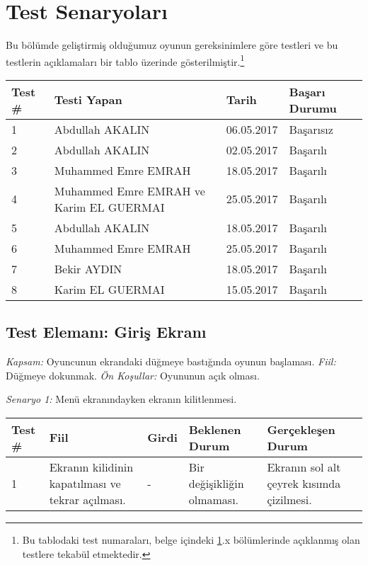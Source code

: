 \documentclass[12pt,a4paper]{article}
\begin{document}
   \section{Test Senaryoları} \label{test}
   Bu bölümde geliştirmiş olduğumuz oyunun gereksinimlere göre testleri ve bu testlerin açıklamaları bir tablo üzerinde gösterilmiştir.\footnote{Bu tablodaki test numaraları, belge içindeki \ref{test}.x bölümlerinde açıklanmış olan testlere tekabül etmektedir.}

   \begin{center}
      \begin{tabular}{ | l | l | l | l | }
      \hline
      Test \# & Testi Yapan & Tarih & Başarı Durumu \\ \hline
      1 & Abdullah AKALIN & 06.05.2017 & Başarısız \\ \hline
      2 & Abdullah AKALIN & 02.05.2017 & Başarılı \\ \hline
      3 & Muhammed Emre EMRAH & 18.05.2017 & Başarılı \\ \hline
      4 & Muhammed Emre EMRAH ve Karim EL GUERMAI & 25.05.2017 & Başarılı \\ \hline
      5 & Abdullah AKALIN & 18.05.2017 & Başarılı \\ \hline
      6 & Muhammed Emre EMRAH & 25.05.2017 & Başarılı \\ \hline
      7 & Bekir AYDIN & 18.05.2017 & Başarılı \\ \hline
      8 & Karim EL GUERMAI & 15.05.2017 & Başarılı \\ \hline
      \end{tabular}
   \end{center}

   \subsection{Test Elemanı: Giriş Ekranı}
   \textit{Kapsam:} Oyuncunun ekrandaki düğmeye bastığında oyunun başlaması. \newline
   \textit{Fiil:} Düğmeye dokunmak. \newline
   \textit{Ön Koşullar:} Oyununun açık olması. \newline

   \textit{Senaryo 1:} Menü ekranındayken ekranın kilitlenmesi. \newline

   \begin{center}
      \begin{tabular}{ | l | p{3cm} | p{3cm} | p{3cm} | p{5cm} | }
      \hline
      Test \# & Fiil & Girdi & Beklenen Durum & Gerçekleşen Durum \\ \hline
      1 & Ekranın kilidinin kapatılması ve tekrar açılması. & - & Bir değişikliğin olmaması. & Ekranın sol alt çeyrek kısımda çizilmesi. \\ \hline
      \end{tabular}
   \end{center}
\end{document}
